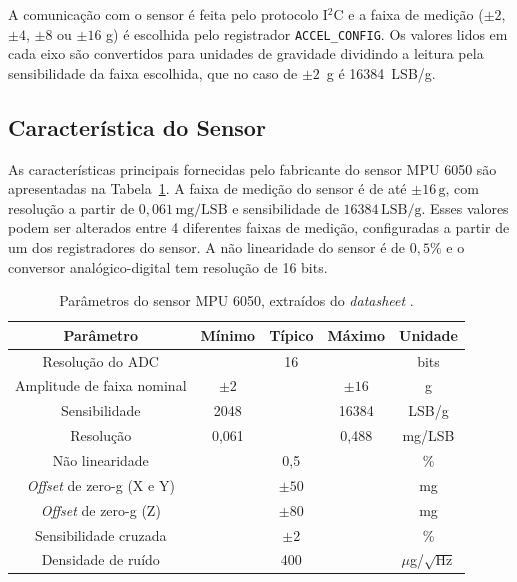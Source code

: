 \documentclass[a4paper, 10pt]{article} %
\begin{document}
A comunicação com o sensor é feita pelo protocolo I$^2$C e a faixa de medição ($\pm 2$, $\pm 4$, $\pm 8$ ou $\pm 16$ g) é escolhida pelo registrador \texttt{ACCEL\_CONFIG}. Os valores lidos em cada eixo são convertidos para unidades de gravidade dividindo a leitura pela sensibilidade da faixa escolhida, que no caso de $\pm 2$~g é 16384~LSB/g.

\subsection{Característica do Sensor}

As características principais fornecidas pelo fabricante do sensor MPU 6050 são apresentadas na Tabela~\ref{tab:parâmetros}. A faixa de medição do sensor é de até $\pm 16\,\mathrm{g}$, com resolução a partir de $0{,}061\,\mathrm{mg/LSB}$ e sensibilidade de $16384\,\mathrm{LSB/g}$. Esses valores podem ser alterados entre 4 diferentes faixas de medição, configuradas a partir de um dos registradores do sensor. A não linearidade do sensor é de $0{,}5\%$ e o conversor analógico-digital tem resolução de 16 bits.

\begin{table}[H]
	\begin{center}
	\begin{tabular}{|c|c|c|c|c|} \hline
		\textbf{Parâmetro} & \textbf{Mínimo} & \textbf{Típico} & \textbf{Máximo} & \textbf{Unidade} \\ \hline
		Resolução do ADC & & 16 & & bits \\ \hline
		Amplitude de faixa nominal & $\pm 2$ & & $\pm 16$ & g \\ \hline
		Sensibilidade & 2048 & & 16384 & LSB/g \\ \hline
		Resolução & 0,061 & & 0,488 & mg/LSB \\ \hline
		Não linearidade & & 0,5 & & \% \\ \hline
		\textit{Offset} de zero-g (X e Y) & & $\pm 50$ & & mg \\ \hline
		\textit{Offset} de zero-g (Z) & & $\pm 80$ & & mg \\ \hline
		Sensibilidade cruzada & & $\pm 2$ & & \% \\ \hline
		Densidade de ruído & & 400 & & $\mu$g/$\sqrt{\mathrm{Hz}}$ \\ \hline
	\end{tabular}
	\caption{Parâmetros do sensor MPU 6050, extraídos do \textit{datasheet} \cite{mpu6050}.}
	\label{tab:parâmetros}
	\end{center}
\end{table}
\end{document}
